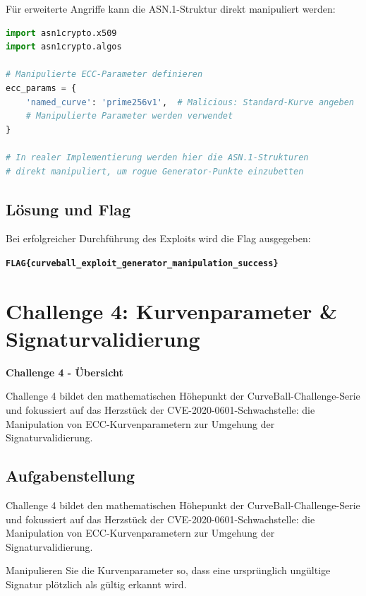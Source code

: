\documentclass{article}
\begin{document}
Für erweiterte Angriffe kann die ASN.1-Struktur direkt manipuliert werden:

\begin{lstlisting}[language=python, caption=ASN.1 ECC Parameter Manipulation]
import asn1crypto.x509
import asn1crypto.algos

# Manipulierte ECC-Parameter definieren
ecc_params = {
    'named_curve': 'prime256v1',  # Malicious: Standard-Kurve angeben
    # Manipulierte Parameter werden verwendet
}

# In realer Implementierung werden hier die ASN.1-Strukturen
# direkt manipuliert, um rogue Generator-Punkte einzubetten
\end{lstlisting}

\subsection{Lösung und Flag}

Bei erfolgreicher Durchführung des Exploits wird die Flag ausgegeben:

\begin{center}
\textbf{\texttt{FLAG\{curveball\_exploit\_generator\_manipulation\_success\}}}
\end{center}

\clearpage

\section{Challenge 4: Kurvenparameter \& Signaturvalidierung}

\begin{solutionbox}
\textbf{Challenge 4 - Übersicht}

Challenge 4 bildet den mathematischen Höhepunkt der CurveBall-Challenge-Serie und fokussiert auf das Herzstück der CVE-2020-0601-Schwachstelle: die Manipulation von ECC-Kurvenparametern zur Umgehung der Signaturvalidierung.
\end{solutionbox}

\subsection{Aufgabenstellung}

Challenge 4 bildet den mathematischen Höhepunkt der CurveBall-Challenge-Serie und fokussiert auf das Herzstück der CVE-2020-0601-Schwachstelle: die Manipulation von ECC-Kurvenparametern zur Umgehung der Signaturvalidierung.

\begin{tcolorbox}[colback=red!10,colframe=red,title=\textbf{Ziel}]
Manipulieren Sie die Kurvenparameter so, dass eine ursprünglich ungültige Signatur plötzlich als gültig erkannt wird.
\end{tcolorbox}
\end{document}
